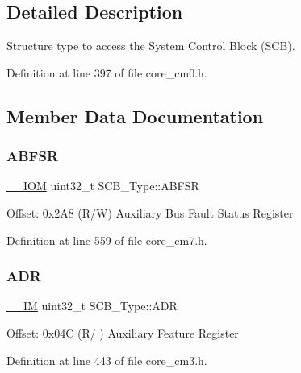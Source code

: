 \subsection{Detailed Description}
Structure type to access the System Control Block (S\+CB). 

Definition at line 397 of file core\+\_\+cm0.\+h.



\subsection{Member Data Documentation}
\mbox{\label{struct_s_c_b___type_a35a95c9a21f43a569a7ac212acb4cee7}} 
\subsubsection{\texorpdfstring{A\+B\+F\+SR}{ABFSR}}
{\footnotesize\ttfamily \hyperlink{core__sc300_8h_ab6caba5853a60a17e8e04499b52bf691}{\+\_\+\+\_\+\+I\+OM} uint32\+\_\+t S\+C\+B\+\_\+\+Type\+::\+A\+B\+F\+SR}

Offset\+: 0x2\+A8 (R/W) Auxiliary Bus Fault Status Register 

Definition at line 559 of file core\+\_\+cm7.\+h.

\mbox{\label{struct_s_c_b___type_af084e1b2dad004a88668efea1dfe7fa1}} 
\subsubsection{\texorpdfstring{A\+DR}{ADR}}
{\footnotesize\ttfamily \hyperlink{core__sc300_8h_a4cc1649793116d7c2d8afce7a4ffce43}{\+\_\+\+\_\+\+IM} uint32\+\_\+t S\+C\+B\+\_\+\+Type\+::\+A\+DR}

Offset\+: 0x04C (R/ ) Auxiliary Feature Register 

Definition at line 443 of file core\+\_\+cm3.\+h.

\mbox{\label{struct_s_c_b___type_ab65372404ce64b0f0b35e2709429404e}} 
